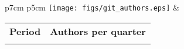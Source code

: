 \begin{tabular}{p{7cm} p{5cm}}
    \vspace{0pt} 
    \texttt{[image: figs/git\_authors.eps]}
    & 
    \vspace{0pt}
    \begin{tabular}{l|r|}%
    \bfseries Period & \bfseries Authors per quarter%
   \csvreader[head to column names]{data/git_authors.csv}{}%
   {\\ & \authors}
   \end{tabular}
  
\end{tabular}






